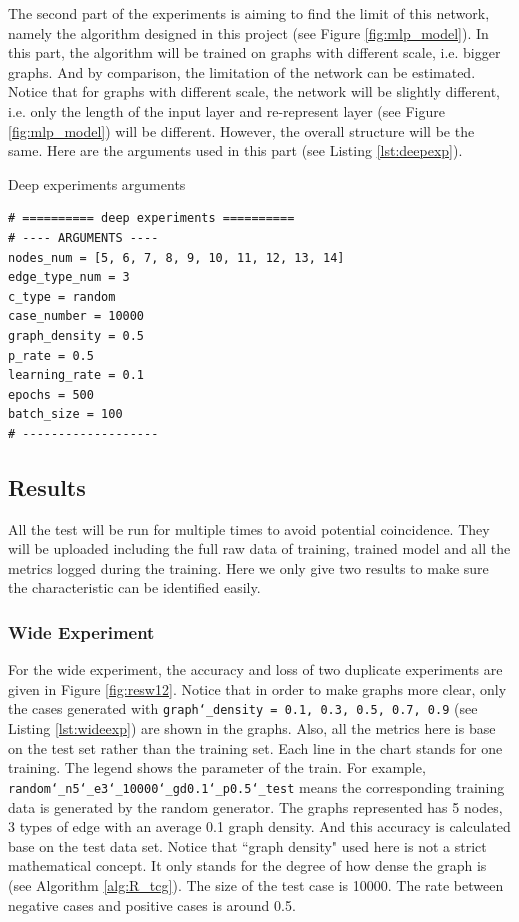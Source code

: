 The second part of the experiments is aiming to find the limit of this network, namely the algorithm designed in this project (see Figure \ref{fig:mlp_model}).
In this part, the algorithm will be trained on graphs with different scale, i.e. bigger graphs.
And by comparison, the limitation of the network can be estimated.
Notice that for graphs with different scale, the network will be slightly different, i.e. only the length of the input layer and re-represent layer (see Figure \ref{fig:mlp_model}) will be different.
However, the overall structure will be the same.
Here are the arguments used in this part (see Listing \ref{lst:deepexp}).\vspace{1em}

\begin{code}
\caption{Deep experiments arguments}
\label{lst:deepexp}
\begin{verbatim}
# ========== deep experiments ==========
# ---- ARGUMENTS ----
nodes_num = [5, 6, 7, 8, 9, 10, 11, 12, 13, 14] 
edge_type_num = 3 
c_type = random 
case_number = 10000 
graph_density = 0.5
p_rate = 0.5 
learning_rate = 0.1
epochs = 500
batch_size = 100
# -------------------
\end{verbatim}
\end{code}

\subsection{Results}
\label{sec:results}
All the test will be run for multiple times to avoid potential coincidence.
They will be uploaded including the full raw data of training, trained model and all the metrics logged during the training.
Here we only give two results to make sure the characteristic can be identified easily.

\subsubsection*{Wide Experiment}
For the wide experiment, the accuracy and loss of two duplicate experiments are given in Figure \ref{fig:resw12}.
Notice that in order to make graphs more clear, only the cases generated with \texttt{graph\char`_density = 0.1, 0.3, 0.5, 0.7, 0.9} (see Listing \ref{lst:wideexp}) are shown in the graphs. 
Also, all the metrics here is base on the test set rather than the training set.
Each line in the chart stands for one training.
The legend shows the parameter of the train.
For example, \texttt{random\char`_n5\char`_e3\char`_10000\char`_gd0.1\char`_p0.5\char`_test} means the corresponding training data is generated by the random generator.
The graphs represented has 5 nodes, 3 types of edge with an average 0.1 graph density.
And this accuracy is calculated base on the test data set.
Notice that ``graph density" used here is not a strict mathematical concept. 
It only stands for the degree of how dense the graph is (see Algorithm \ref{alg:R_tcg}).
The size of the test case is 10000. 
The rate between negative cases and positive cases is around 0.5.

